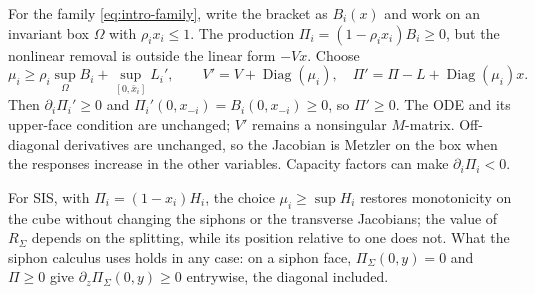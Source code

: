 For the family \eqref{eq:intro-family}, write the
bracket as $B_i(x)$ and work on an invariant box $\Omega$ with
$\rho_ix_i\le1$. The production $\Pi_i=(1-\rho_ix_i)B_i\ge0$, but the
nonlinear removal is outside the linear form $-Vx$. Choose
\[
 \mu_i\ge\rho_i\sup_\Omega B_i+\sup_{[0,\bar x_i]}L_i',\qquad
 V'=V+\operatorname{Diag}(\mu_i),\quad \Pi' =\Pi-L+\operatorname{Diag}(\mu_i)x.
\]
Then $\partial_i\Pi_i'\ge0$ and $\Pi_i'(0,x_{-i})=B_i(0,x_{-i})\ge0$,
so $\Pi'\ge0$. The ODE and its upper-face condition are unchanged;
$V'$ remains a nonsingular $M$-matrix. Off-diagonal derivatives are
unchanged, so the Jacobian is Metzler on the box when the responses increase
in the other variables. Capacity factors can make $\partial_i\Pi_i<0$.

For SIS, with $\Pi_i=(1-x_i)H_i$, the
choice $\mu_i\ge\sup H_i$ restores monotonicity on the cube without changing the siphons or the
transverse Jacobians; the value of $R_\Sigma$ depends on the splitting, while its position relative to
one does not. What the siphon calculus uses holds in any case: on a siphon face,
$\Pi_\Sigma(0,y)=0$ and $\Pi\ge0$ give $\partial_z\Pi_\Sigma(0,y)\ge0$ entrywise, the diagonal included.

